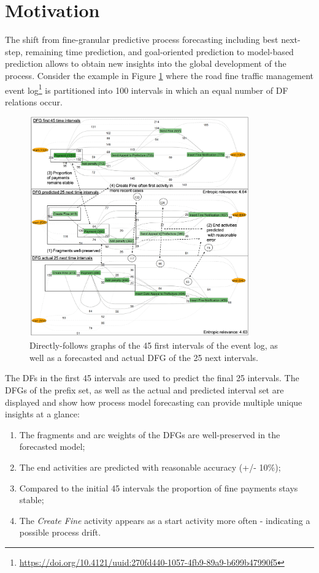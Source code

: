 \section{Motivation}\label{sec:2:motivation}

The shift from fine-granular predictive process forecasting including best next-step, remaining time prediction, and goal-oriented prediction to model-based prediction allows to obtain new insights into the global development of the process.
Consider the example in Figure \ref{fig:dfg_example_intro} where the road fine traffic management event log\footnote{\url{https://doi.org/10.4121/uuid:270fd440-1057-4fb9-89a9-b699b47990f5}} is partitioned into 100 intervals in which an equal number of DF relations occur.
\begin{figure}
    \centering
    \includegraphics[width=0.85\textwidth]{img/MotExample2.png}
    \caption{Directly-follows graphs of the 45 first intervals of the event log, as well as a forecasted and actual DFG of the 25 next intervals.}
    \label{fig:dfg_example_intro}
\end{figure}
The DFs in the first 45 intervals are used to predict the final 25 intervals.
The DFGs of the prefix set, as well as the actual and predicted interval set are displayed and show how process model forecasting can provide multiple unique insights at a glance:
\begin{enumerate}
    \item The fragments and arc weights of the DFGs are well-preserved in the forecasted model;
    \item The end activities are predicted with reasonable accuracy (+/- 10\%);
    \item Compared to the initial 45 intervals the proportion of fine payments stays stable;
    \item The \emph{Create Fine} activity appears as a start activity more often - indicating a possible process drift.
\end{enumerate}
